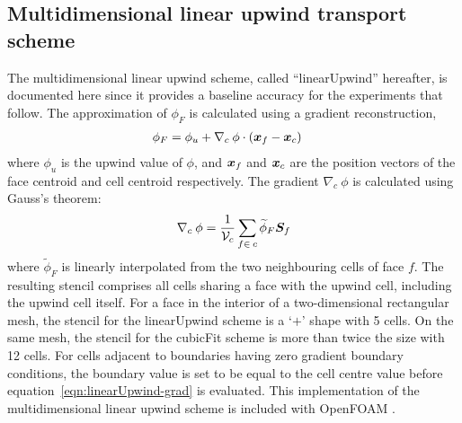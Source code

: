 \subsection{Multidimensional linear upwind transport scheme}

The multidimensional linear upwind scheme, called ``linearUpwind'' hereafter, is documented here since it provides a baseline accuracy for the experiments that follow.  The approximation of $\phi_F$ is calculated using a gradient reconstruction,
\begin{align}
	\phi_F &= \phi_u + \nabla_c\: \phi \cdot \left(\bm{x}_f - \bm{x}_c \right)
\end{align} 
where $\phi_u$ is the upwind value of $\phi$, and $\bm{x}_f$ and $\bm{x}_c$ are the position vectors of the face centroid and cell centroid respectively.
The gradient $\nabla_c \:\phi$ is calculated using Gauss's theorem:
\begin{align}
	\nabla_c\: \phi = \frac{1}{\mathcal{V}_c} \sum_{f\in\:c} \widetilde{\phi}_F \bm{S}_f \label{eqn:linearUpwind-grad}
\end{align}
where $\widetilde{\phi}_F$ is linearly interpolated from the two neighbouring cells of face $f$.
The resulting stencil comprises all cells sharing a face with the upwind cell, including the upwind cell itself.  For a face in the interior of a two-dimensional rectangular mesh, the stencil for the linearUpwind scheme is a `$+$' shape with 5 cells.  On the same mesh, the stencil for the cubicFit scheme is more than twice the size with 12 cells.
For cells adjacent to boundaries having zero gradient boundary conditions, the boundary value is set to be equal to the cell centre value before equation~\eqref{eqn:linearUpwind-grad} is evaluated.
This implementation of the multidimensional linear upwind scheme is included with OpenFOAM \citep{openfoam-numerics}.
